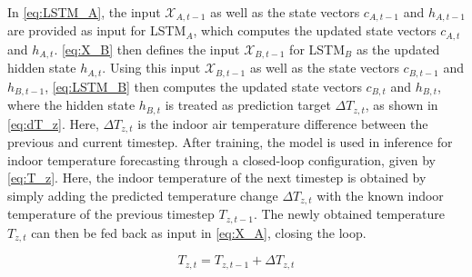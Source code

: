 In \autoref{eq:LSTM_A}, the input $\mathcal{X}_{A,t-1}$ as well as the state vectors $c_{A,t-1}$ and $h_{A,t-1}$ are provided as input for LSTM$_A$, which computes the updated state vectors $c_{A,t}$ and $h_{A,t}$. \autoref{eq:X_B} then defines the input $\mathcal{X}_{B,t-1}$ for LSTM$_B$ as the updated hidden state $h_{A,t}$. Using this input $\mathcal{X}_{B,t-1}$ as well as the state vectors $c_{B,t-1}$ and $h_{B,t-1}$, \autoref{eq:LSTM_B} then computes the updated state vectors $c_{B,t}$ and $h_{B,t}$, where the hidden state $h_{B,t}$ is treated as prediction target $\Delta T_{z,t}$, as shown in \autoref{eq:dT_z}. Here, $\Delta T_{z,t}$ is the indoor air temperature difference between the previous and current timestep. After training, the model is used in inference for indoor temperature forecasting through a closed-loop configuration, given by \autoref{eq:T_z}. Here, the indoor temperature of the next timestep is obtained by simply adding the predicted temperature change $\Delta T_{z,t}$ with the known indoor temperature of the previous timestep $T_{z,t-1}$. The newly obtained temperature $T_{z,t}$ can then be fed back as input in \autoref{eq:X_A}, closing the loop. 



\begin{equation}
    T_{z,t} = T_{z,t-1} + \Delta T_{z,t}
    \label{eq:T_z}
\end{equation}

     




